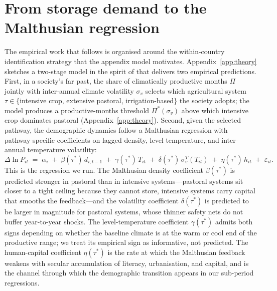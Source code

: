 \documentclass[11pt,letterpaper]{article}
\begin{document}
\section{From storage demand to the Malthusian regression}
\label{sec:identification}

The empirical work that follows is organised around the within-country identification strategy that the appendix model motivates. Appendix~\ref{app:theory} sketches a two-stage model in the spirit of \citet{ashraf2011dynamics} that delivers two empirical predictions. First, in a society's far past, the share of climatically productive months $\Pi$ jointly with inter-annual climate volatility $\sigma_v$ selects which agricultural system $\tau \in \{$intensive crop, extensive pastoral, irrigation-based$\}$ the society adopts; the model produces a productive-months threshold $\Pi^*(\sigma_v)$ above which intensive crop dominates pastoral (Appendix~\ref{app:theory}). Second, given the selected pathway, the demographic dynamics follow a Malthusian regression with pathway-specific coefficients on lagged density, level temperature, and inter-annual temperature volatility:
\begin{equation}
  \Delta \ln P_{it} \;=\; \alpha_i \;+\; \beta(\tau^\ast)\, d_{i,t-1} \;+\; \gamma(\tau^\ast)\, T_{it} \;+\; \delta(\tau^\ast)\, \sigma_v^T(T_{it}) \;+\; \eta(\tau^\ast)\, h_{it} \;+\; \varepsilon_{it}.
  \label{eq:malthus-main}
\end{equation}
This is the regression we run. The Malthusian density coefficient $\beta(\tau^\ast)$ is predicted stronger in pastoral than in intensive systems---pastoral systems sit closer to a tight ceiling because they cannot store, intensive systems carry capital that smooths the feedback---and the volatility coefficient $\delta(\tau^\ast)$ is predicted to be larger in magnitude for pastoral systems, whose thinner safety nets do not buffer year-to-year shocks. The level-temperature coefficient $\gamma(\tau^\ast)$ admits both signs depending on whether the baseline climate is at the warm or cool end of the productive range; we treat its empirical sign as informative, not predicted. The human-capital coefficient $\eta(\tau^\ast)$ is the rate at which the Malthusian feedback weakens with secular accumulation of literacy, urbanisation, and capital, and is the channel through which the demographic transition appears in our sub-period regressions.
\end{document}
